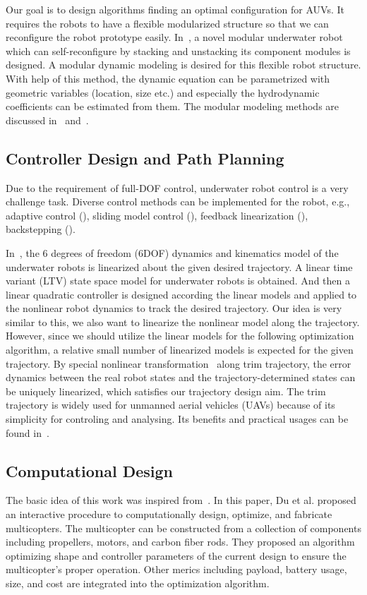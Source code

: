 Our goal is to design algorithms finding an optimal configuration for AUVs. It requires the robots to have a flexible modularized structure so that we can reconfigure the robot prototype easily.  In~\cite{Vasilescu2005}, a novel modular  underwater robot which can self-reconfigure by stacking and unstacking its component modules is designed. A modular dynamic modeling is desired for this flexible robot structure. With help of this method, the dynamic equation can be parametrized with geometric variables (location, size etc.) and especially the hydrodynamic coefficients can be estimated from them. The modular modeling methods are discussed in~\cite{Chen2007} and~\cite{Sia1999}.
\subsection{Controller Design and Path Planning}
Due to the requirement of full-DOF control, underwater robot control is a very challenge task. Diverse control methods can be implemented for the robot, e.g., adaptive control (\cite{JYuh1990,Svein1991}), sliding model control (\cite{JSoltine1985,Narimani2006}), feedback linearization (\cite{Wadoo2003}), backstepping (\cite{Jian2015,Wadoo2003}).

In~\cite{Makdah2016}, the 6 degrees of freedom (6DOF) dynamics and kinematics model of the underwater robots is linearized about the given desired trajectory. A linear time variant (LTV) state space model for underwater robots is obtained. And then a linear quadratic controller is designed according the linear models and applied to the nonlinear robot dynamics to track the desired trajectory. Our idea is very similar to this, we also want to linearize the nonlinear model along the trajectory. However, since we should utilize the linear models for the following optimization algorithm, a relative small number of linearized models is expected for the given trajectory. By special nonlinear transformation~\cite{RNC705} along trim trajectory, the error dynamics between the real robot states and the trajectory-determined states can be uniquely linearized, which satisfies our trajectory design aim. The trim trajectory is widely used for unmanned aerial vehicles (UAVs) because of its simplicity for controling and analysing. Its benefits and practical usages can be found in~\cite{Beji2005,Bottasso2008,Sebbane2015}.
   
\subsection{Computational Design}
The basic idea of this work was inspired from~\cite{Du2016}. In this paper, Du et al. proposed  an  interactive  procedure to computationally design, optimize, and fabricate multicopters. The multicopter can be constructed from  a  collection  of  components including propellers, motors, and carbon fiber rods. They proposed an algorithm optimizing shape and controller parameters of the current design to ensure the multicopter's proper operation. Other merics including payload, battery usage, size, and cost are integrated into the optimization algorithm.

